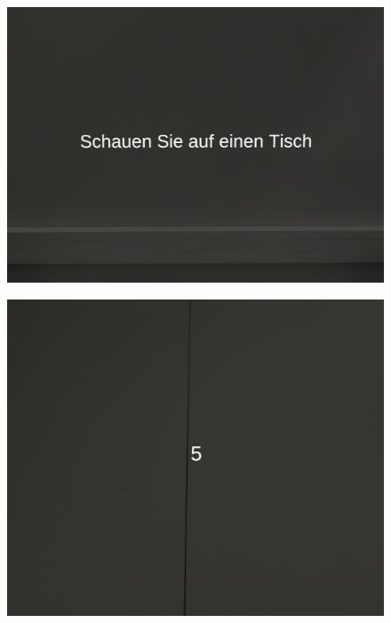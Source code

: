 \begin{figure}[H]
    \centering
    \begin{minipage}[b]{0.30\textwidth}
        \centering
        \includegraphics[width=\textwidth]{images/schritteins.png}
        \label{fig:eins}
    \end{minipage}
    \hfill
    \begin{minipage}[b]{0.30\textwidth}
        \centering
        \includegraphics[width=\textwidth]{images/schrittzwei.png}
        \label{fig:zwei}
    \end{minipage}
    \hfill
    \begin{minipage}[b]{0.30\textwidth}

\end{minipage}
\end{figure}
